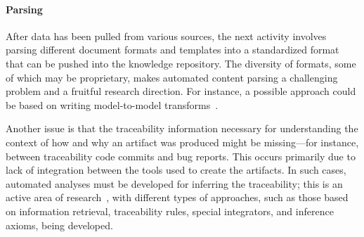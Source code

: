 
\vskip -5pt
\paragraph*{Parsing} After data has been pulled from various
sources, the next activity involves parsing different document formats and
templates into a standardized format that can be pushed into the knowledge
repository. The diversity of formats, some of which may be proprietary, makes
automated content parsing a challenging problem and a fruitful research
direction. For instance, a possible approach could be based on writing
model-to-model transforms~\cite{debdoot:2010:scc}.

Another issue is that the traceability information necessary for understanding
the context of how and why an artifact was produced might be missing---for
instance, between traceability code commits and bug reports. This occurs
primarily due to lack of integration between the tools used to create the
artifacts. In such cases, automated analyses must be developed for inferring the
traceability; this is an active area of research~\cite{spanoudakis2005software},
with different types of approaches, such as those based on information
retrieval, traceability rules, special integrators, and inference axioms, being
developed.

